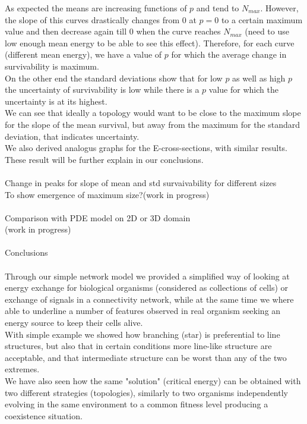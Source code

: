 \documentclass{amsart}
\theoremstyle{plain}
\numberwithin{equation}{section}
\begin{document}
As expected the means are increasing functions of $p$ and tend to $N_{max}$. However, the slope of this curves drastically changes from $0$ at $p=0$ to a certain maximum value and then decrease again till $0$ when the curve reaches $N_{max}$ (need to use low enough mean energy to be able to see this effect). Therefore, for each curve (different mean energy), we have a value of $p$ for which the average change in survivability is maximum.\\
On the other end the standard deviations show that for low $p$ as well as high $p$ the uncertainty of survivability is low while there is a $p$ value for which the uncertainty is at its highest.\\
We can see that ideally a topology would want to be close to the maximum slope for the slope of the mean survival, but away from the maximum for the standard deviation, that indicates uncertainty. \\
We also derived analogus graphs for the E-cross-sections, with similar results.\\
These result will be further explain in our conclusions.\\\\
Change in peaks for slope of mean and std survaivability for different sizes\\
To show emergence of maximum size?(work in progress)\\\\
Comparison with PDE model on 2D or 3D domain\\
(work in progress)\\\\
Conclusions\\
\\
Through our simple network model we provided a simplified way of looking at energy exchange for biological organisms (considered as collections of cells) or exchange of signals in a connectivity network, while at the same time we where able to underline a number of features observed in real organism seeking an energy source to keep their cells alive.\\
With simple example we showed how branching (star) is preferential to line structures, but also that in certain conditions more line-like structure are acceptable, and that intermediate structure can be worst than any of the two extremes.\\
We have also seen how the same "solution" (critical energy) can be obtained with two different strategies (topologies), similarly to two organisms independently evolving in the same environment to a common fitness level producing a coexistence situation.\\
\end{document}
